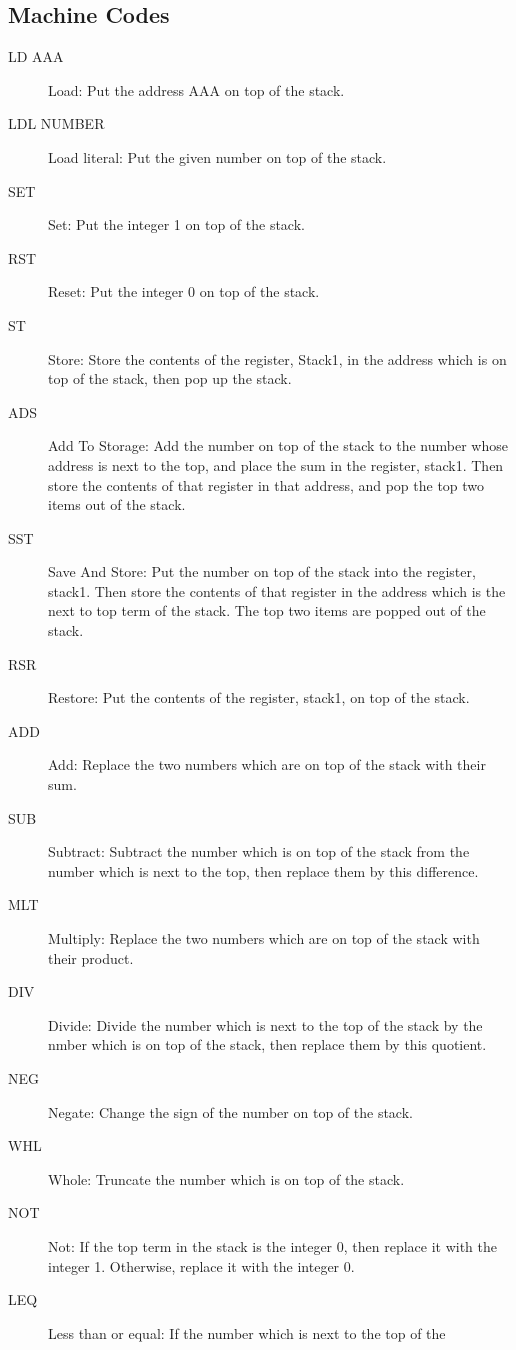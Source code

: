 \documentclass[twocolumn]{article}
\begin{document}
\subsection{Machine Codes}
\begin{description}
\item[LD  AAA] Load: Put the address AAA on top of the stack.
\item[LDL NUMBER] Load literal: Put the given number on top of the stack.
\item[SET] Set: Put the integer 1 on top of the stack.
\item[RST] Reset: Put the integer 0 on top of the stack.
\item[ST] Store: Store the contents of the register, Stack1, in the address
which is on top of the stack, then pop up the stack.
\item[ADS] Add To Storage: Add the number on top of the stack to the number
whose address is next to the top, and place the sum in the register, stack1.
Then store the contents of that register in that address, and pop the top
two items out of the stack.
\item[SST] Save And Store: Put the number on top of the stack into the register,
stack1. Then store the contents of that register in the address which is the
next to top term of the stack.
The top two items are popped out of the stack.
\item[RSR] Restore: Put the contents of the register, stack1, on top of the stack.
\item[ADD] Add: Replace the two numbers which are on top of the stack with their sum.
\item[SUB] Subtract: Subtract the number which is on top of the stack from
the number which is next to the top, then replace them by this difference.
\item[MLT] Multiply: Replace the two numbers which are on top of the stack
with their product.
\item[DIV] Divide: Divide the number which is next to the top of the stack by the
nmber which is on top of the stack, then replace them by this quotient.
\item[NEG] Negate: Change the sign of the number on top of the stack.
\item[WHL] Whole: Truncate the number which is on top of the stack.
\item[NOT] Not: If the top term in the stack is the integer 0, then replace
it with the integer 1. Otherwise, replace it with the integer 0.
\item[LEQ] Less than or equal: If the number which is next to the top of the

\end{description}
\end{document}
